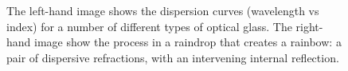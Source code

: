 \documentclass[12pt]{article}
\begin{document}
\begin{figure}
  \centering
  \caption{The left-hand image shows the dispersion curves (wavelength
  vs index) for a number of different types of optical glass.  The
  right-hand image show the process in a raindrop that creates a
  rainbow: a pair of dispersive refractions, with an intervening
  internal reflection.}
  \label{fig:dispersion}
\end{figure}
\end{document}
